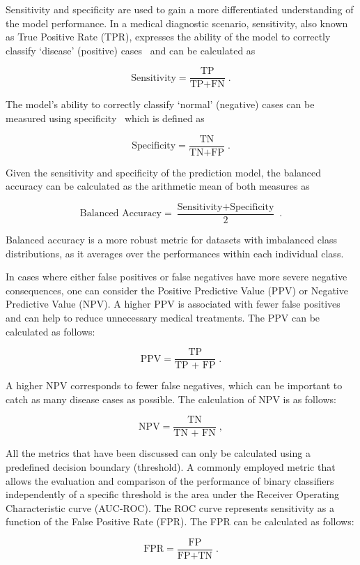 Sensitivity and specificity are used to gain a more differentiated understanding of the model performance.
In a medical diagnostic scenario, sensitivity, also known as True Positive Rate (TPR),
expresses the ability of the model to correctly classify `disease' (positive) cases~\citep{Parikh2008-ch} 
and can be calculated as

\begin{equation}
  \label{eq:sens}
  \text{Sensitivity} = \frac{\text{TP}}{\text{TP} + \text{FN}} \;.
\end{equation}

The model's ability to correctly classify `normal' (negative) cases can be measured using specificity~\citep{Parikh2008-ch} which is defined as

\begin{equation}
  \label{eq:spec}
  \text{Specificity} = \frac{\text{TN}}{\text{TN} + \text{FP}} \;.
\end{equation}

Given the sensitivity and specificity of the prediction model,
the balanced accuracy can be calculated as the arithmetic mean of both measures as

\begin{equation}
  \label{eq:bacc}
  \text{Balanced Accuracy} = \frac{\text{Sensitivity} + \text{Specificity}}{2} \;.
\end{equation}

Balanced accuracy is a more robust metric for datasets with imbalanced class distributions,
as it averages over the performances within each individual class.

In cases where either false positives or false negatives have more severe negative consequences,
one can consider the Positive Predictive Value (PPV) or Negative Predictive Value (NPV).
A higher PPV is associated with fewer false positives and can help to reduce unnecessary medical treatments.
The PPV can be calculated as follows:

\begin{equation}
  \label{eq:ppv}
  \text{PPV} = \frac{\text{TP}}{\text{TP + FP}} \;.
\end{equation}

A higher NPV corresponds to fewer false negatives, which can be important to catch as many disease cases as possible.
The calculation of NPV is as follows:

\begin{equation}
  \label{eq:npv}
  \text{NPV} = \frac{\text{TN}}{\text{TN + FN}} \;,
\end{equation}

All the metrics that have been discussed can only be calculated using a predefined decision boundary (threshold).
A commonly employed metric that allows the evaluation and comparison of the performance of binary classifiers 
independently of a specific threshold is the area under the Receiver Operating Characteristic curve (AUC-ROC).
The ROC curve represents sensitivity as a function of the False Positive Rate (FPR).
The FPR can be calculated as follows:

\begin{equation}
  \label{eq:fpr}
  \text{FPR} = \frac{\text{FP}}{\text{FP} + \text{TN}} \;.
\end{equation}
